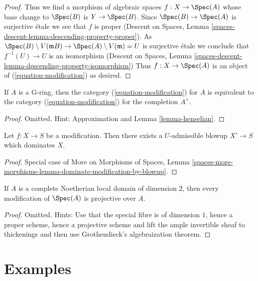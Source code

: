 \begin{proof}
\medskip\noindent
Thus we find a morphism of algebraic spaces $f : X \to \Spec(A)$
whose base change to $\Spec(B)$ is $Y \to \Spec(B)$. Since
$\Spec(B) \to \Spec(A)$ is surjective \'etale we see that $f$
is proper (Descent on Spaces, Lemma
\ref{spaces-descent-lemma-descending-property-proper}). As
$\Spec(B) \setminus V(\mathfrak m B) \to \Spec(A) \setminus V(\mathfrak m) = U$
is surjective \'etale we conclude that $f^{-1}(U) \to U$ is an
isomorphism (Descent on Spaces, Lemma
\ref{spaces-descent-lemma-descending-property-isomorphism})
Thus $f : X \to \Spec(A)$ is an
object of (\ref{equation-modification}) as desired.
\end{proof}

\begin{lemma}
\label{lemma-G-ring}
If $A$ is a G-ring, then the category (\ref{equation-modification})
for $A$ is equivalent to the category (\ref{equation-modification})
for the completion $A^\wedge$.
\end{lemma}

\begin{proof}
Omitted. Hint: Approximation and Lemma \ref{lemma-henselian}.
\end{proof}

\begin{lemma}
\label{lemma-dominate-by-admissible-blowup}
Let $f : X \to S$ be a modification. Then there exists a $U$-admissible
blowup $X' \to S$ which dominates $X$.
\end{lemma}

\begin{proof}
Special case of More on Morphisms of Spaces,
Lemma \ref{spaces-more-morphisms-lemma-dominate-modification-by-blowup}.
\end{proof}

\begin{lemma}
\label{lemma-projective-over-complete}
If $A$ is a complete Noetherian local domain of dimension $2$,
then every modification of $\Spec(A)$ is projective over $A$.
\end{lemma}

\begin{proof}
Omitted. Hints: Use that the special fibre is of dimension $1$,
hence a proper scheme, hence a projective scheme and lift the
ample invertible sheaf to thickenings and then use Grothendieck's
algebraization theorem.
\end{proof}






\section{Examples}
\label{section-examples}

